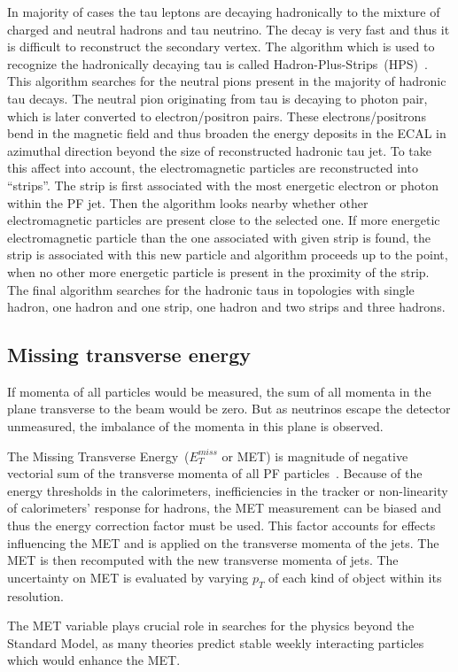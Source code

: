 In majority of cases the tau leptons are decaying hadronically to the mixture of charged and neutral hadrons and tau neutrino. The decay is very fast and thus it is difficult to reconstruct the secondary vertex. The algorithm which is used to recognize the hadronically decaying tau is called Hadron-Plus-Strips~(HPS)~\cite{CMS:2016gvn}. This algorithm searches for the neutral pions present in the majority of hadronic tau decays. The neutral pion originating from tau is  decaying to photon pair, which is later converted to electron/positron pairs. These electrons/positrons bend in the magnetic field and thus broaden the energy deposits in the ECAL in azimuthal direction beyond the size of reconstructed hadronic tau jet. To take this affect into account, the electromagnetic particles  are reconstructed into ``strips''. The strip is first associated with the most energetic electron or photon within the PF jet. Then the algorithm looks nearby whether other electromagnetic particles are present close to the selected one. If more energetic electromagnetic particle than the one associated with given strip is found, the strip is associated with this new particle and algorithm proceeds up to the point, when no other more energetic particle is present in the proximity of the strip. The final algorithm searches for the hadronic taus in topologies with single hadron, one hadron and one strip, one hadron and two strips and three hadrons.

\subsection{Missing transverse energy}


If momenta of all particles would be measured, the sum of all momenta in the plane transverse to the beam would be zero. But as neutrinos escape the detector unmeasured, the imbalance of the momenta in this plane is observed. 

The Missing Transverse Energy~($E_{T}^{miss}$ or MET) is magnitude of negative vectorial sum of the transverse momenta of all PF particles~\cite{CMS:2016ljj}. Because of the energy thresholds in the calorimeters, inefficiencies in the tracker or non-linearity of calorimeters' response for hadrons, the MET measurement can be biased and thus the energy correction factor must be used. This factor accounts for effects influencing the MET and is applied on the transverse momenta of the jets. The MET is then recomputed with the new transverse momenta of jets. The uncertainty on MET is evaluated by varying $p_{T}$ of each kind of object within its resolution. 

The MET variable plays crucial role in searches for the physics beyond the Standard Model, as many theories predict stable weekly interacting particles which would enhance the MET.
